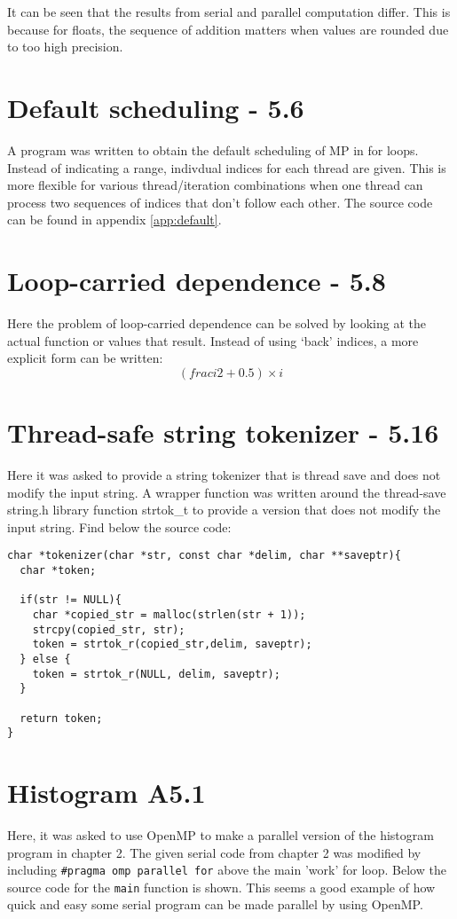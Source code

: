 \documentclass[a4paper,11pt,twoside]{article}
\begin{document}
It can be seen that the results from serial and parallel computation differ. This is because for floats, the sequence of addition matters when values are rounded due to too high precision. 

\section{Default scheduling - 5.6}
A program was written to obtain the default scheduling of MP in for loops. Instead of indicating a range, indivdual indices for each thread are given. This is more flexible for various thread/iteration combinations when one thread can process two sequences of indices that don't follow each other. The source code can be found in appendix \ref{app:default}.  

\section{Loop-carried dependence - 5.8}
Here the problem of loop-carried dependence can be solved by looking at the actual function or values that result. Instead of using `back' indices, a more explicit form can be written:
\begin{equation}
(frac{i}{2} + 0.5)\times i  
\end{equation}

\section{Thread-safe string tokenizer - 5.16}
Here it was asked to provide a string tokenizer that is thread save and does not modify the input string.
A wrapper function was written around the thread-save string.h library function strtok_t to provide a version that does not modify the input string. Find below the source code:
\begin{verbatim}
char *tokenizer(char *str, const char *delim, char **saveptr){
  char *token;

  if(str != NULL){
    char *copied_str = malloc(strlen(str + 1));
    strcpy(copied_str, str);
    token = strtok_r(copied_str,delim, saveptr);
  } else {
    token = strtok_r(NULL, delim, saveptr); 
  }

  return token; 
}
\end{verbatim}

\section{Histogram A5.1}
Here, it was asked to use OpenMP to make a parallel version of the histogram program in chapter 2. The given serial code from chapter 2 was modified by including \verb+#pragma omp parallel for+ above the main 'work' for loop. Below the source code for the \verb+main+ function is shown. This seems a good example of how quick and easy some serial program can be made parallel by using OpenMP.
\end{document}
